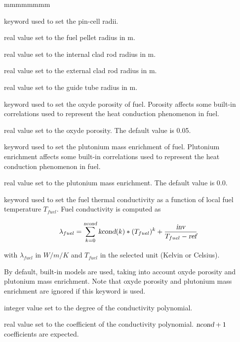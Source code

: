 \begin{ListeDeDescription}{mmmmmmmm}
\item[\moc{RADIUS}] keyword used to set the pin-cell radii.

\item[\dusa{r1}] real value set to the fuel pellet radius in m.

\item[\dusa{r2}] real value set to the internal clad rod radius in m.

\item[\dusa{r3}] real value set to the external clad rod radius in m.

\item[\dusa{r4}] real value set to the guide tube radius in m.

\item[\moc{POROS}] keyword used to set the oxyde porosity of fuel. Porosity affects some built-in correlations
used to represent the heat conduction phenomenon in fuel.

\item[\dusa{poros}] real value set to the oxyde porosity. The default value is 0.05.

\item[\moc{PUFR}] keyword used to set the plutonium mass enrichment of fuel. Plutonium enrichment affects some built-in correlations
used to represent the heat conduction phenomenon in fuel.

\item[\dusa{pufr}] real value set to the plutonium mass enrichment. The default value is 0.0.

\item[\moc{CONDF}] keyword used to set the fuel thermal conductivity as a function of local fuel temperature $T_{fuel}$.
Fuel conductivity is computed as

$$\lambda_{fuel} = \sum_{k=0}^{\dusa{ncond}} {\dusa{kcond}(k)*(T_{fuel})^k + \frac{\dusa{inv}}{T_{fuel}-\dusa{ref}}}$$

with $\lambda_{fuel}$ in $W/m/K$ and $T_{fuel}$ in the selected unit (Kelvin or Celsius).

By default, built-in models are used, taking into account oxyde porosity and plutonium mass enrichment.
Note that oxyde porosity and plutonium mass enrichment are ignored if this keyword is used.

\item[\dusa{ncond}] integer value set to the degree of the conductivity polynomial.

\item[\dusa{kcond}] real value set to the coefficient of the conductivity polynomial. $\dusa{ncond}+1$ coefficients are expected.


\end{ListeDeDescription}
